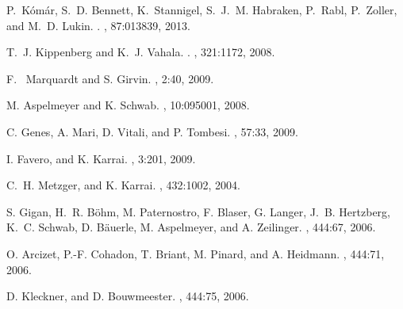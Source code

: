 
{ 
\ssp %
  

}

 
\ssp %
\begin{thebibliography}{1}


P.~K\'{o}m\'{a}r, 
S.~D. Bennett, 
K.~Stannigel, 
S.~J.~M. Habraken, 
P.~Rabl,
P.~Zoller, 
and M.~D. Lukin.
.
,
87:013839, 2013.

%
T.~J. Kippenberg
and K.~J. Vahala.
.
,
321:1172, 2008.

%
F.~ Marquardt
and S. Girvin.
,
2:40, 2009.

%
M. Aspelmeyer
and K. Schwab.
,
10:095001, 2008.

%
C. Genes,
A. Mari,
D. Vitali,
and P. Tombesi.
,
57:33, 2009.

I. Favero,
and K. Karrai.
,
3:201, 2009.

C.~H. Metzger,
and K. Karrai.
,
432:1002, 2004.

S. Gigan,
H.~R. B\"{o}hm,
M. Paternostro,
F. Blaser,
G. Langer,
J.~B. Hertzberg,
K.~C. Schwab,
D. B\"{a}uerle,
M. Aspelmeyer,
and A. Zeilinger.
,
444:67, 2006.

O. Arcizet,
P.-F. Cohadon,
T. Briant,
M. Pinard,
and A. Heidmann.
,
444:71, 2006.

D. Kleckner,
and D. Bouwmeester.
,
444:75, 2006.


\end{thebibliography}
